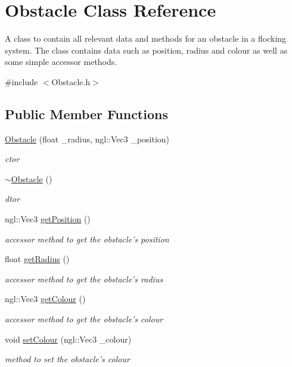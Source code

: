 \hypertarget{classObstacle}{
\section{Obstacle Class Reference}
\label{classObstacle}
}


A class to contain all relevant data and methods for an obstacle in a flocking system. The class contains data such as position, radius and colour as well as some simple accessor methods.  


{\ttfamily \#include $<$Obstacle.h$>$}\subsection*{Public Member Functions}
\begin{DoxyCompactItemize}
\item 
\hyperlink{classObstacle_a82fdea9766df325ecf133cd3f558db7c}{Obstacle} (float \_\-radius, ngl::Vec3 \_\-position)
\begin{DoxyCompactList}\small\item\em ctor \item\end{DoxyCompactList}\item 
\hyperlink{classObstacle_af2f9cc9c6cff75dca0974fd5ac4f71a9}{$\sim$Obstacle} ()
\begin{DoxyCompactList}\small\item\em dtor \item\end{DoxyCompactList}\item 
ngl::Vec3 \hyperlink{classObstacle_a9454af032c08064469f0c4a63dbcf860}{getPosition} ()
\begin{DoxyCompactList}\small\item\em accessor method to get the obstacle's position \item\end{DoxyCompactList}\item 
float \hyperlink{classObstacle_a6b6bb129cfe0a8434bb4231f34aebf82}{getRadius} ()
\begin{DoxyCompactList}\small\item\em accessor method to get the obstacle's radius \item\end{DoxyCompactList}\item 
ngl::Vec3 \hyperlink{classObstacle_adfb1ad56541f71efff0c701d7b2bbd0b}{getColour} ()
\begin{DoxyCompactList}\small\item\em accessor method to get the obstacle's colour \item\end{DoxyCompactList}\item 
void \hyperlink{classObstacle_ab041ef36674a8c2df9119fc5a3f9b89b}{setColour} (ngl::Vec3 \_\-colour)
\begin{DoxyCompactList}\small\item\em method to set the obstacle's colour \item\end{DoxyCompactList}\end{DoxyCompactItemize}


